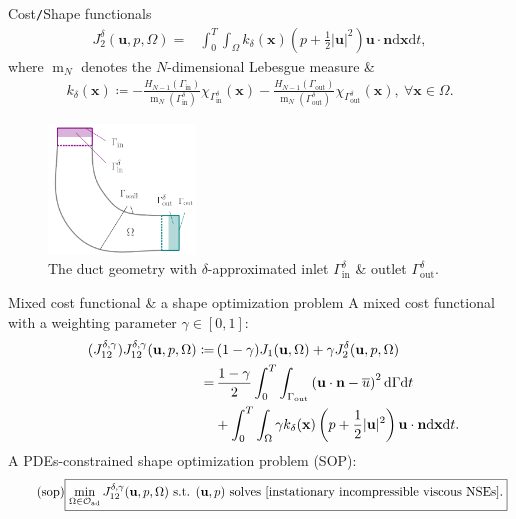 \documentclass[10pt
hyperref={
    pdfauthor={Hong Quan Ba Nguyen},
    pdftitle={Optimal Shape Design of Air Ducts in Combustion Engines: Design a General Framework},
    pdfsubject={Talk},
    pdfcreator={LaTeX},
}
]{beamer}
\begin{document}
\begin{frame}{Cost\texttt{/}Shape functionals}
    \begin{align*}
        J_2^\delta(\textbf{u},p,\Omega) =& \int_0^T\int_\Omega k_\delta(\textbf{x})\left(p + \frac{1}{2}|\textbf{u}|^2\right)\textbf{u}\cdot\textbf{n}\textrm{d}\textbf{x}\textrm{d}t,
    \end{align*}
    where $\operatorname{m}_N$ denotes the $N$-dimensional Lebesgue measure {\small\&}
    \begin{align*}
        k_\delta(\textbf{x})\coloneqq -\frac{H_{N-1}(\Gamma_{\textrm{in}})}{\operatorname{m}_N(\Gamma_{\textrm{in}}^\delta)}\chi_{\Gamma_{\textrm{in}}^\delta}(\textbf{x}) - \frac{H_{N-1}(\Gamma_{\textrm{out}})}{\operatorname{m}_N(\Gamma_{\textrm{out}}^\delta)}\chi_{\Gamma_{\textrm{out}}^\delta}(\textbf{x}),\ \forall\textbf{x}\in\Omega.
    \end{align*}
    \begin{figure}[h]
        \centering
        \includegraphics[width=0.35\textwidth]{geometry_delta}
        \caption{The duct geometry with $\delta$-approximated inlet $\Gamma_{\textrm{in}}^\delta$ {\small\&} outlet $\Gamma_{\textrm{out}}^\delta$.}
        \label{fig:geometry cutoff inlet outlet}
    \end{figure}
\end{frame}

\begin{frame}{Mixed cost functional {\small\&} a shape optimization problem}
    A mixed cost functional with a weighting parameter $\gamma\in[0,1]$:
    \begin{align}
        \label{mixed cost functional}
        \tag{$J_{12}^{\delta,\gamma}$}
        J_{12}^{\delta,\gamma}(\textbf{u},p,\Omega)\coloneqq&\, (1 - \gamma)J_1(\textbf{u},\Omega) + \gamma J_2^\delta(\textbf{u},p,\Omega)\\
        =&\, \frac{1 - \gamma}{2}\int_0^T\int_{\Gamma_{\textrm{out}}} \left(\textbf{u}\cdot\textbf{n} - \overline{u}\right)^2\textrm{d}\Gamma\textrm{d}t\nonumber\\
        &+ \int_0^T\int_\Omega \gamma k_\delta(\textbf{x})\left(p + \frac{1}{2}|\textbf{u}|^2\right)\textbf{u}\cdot\textbf{n}\textrm{d}\textbf{x}\textrm{d}t.\nonumber
    \end{align}
    A PDEs-constrained shape optimization problem (SOP):
    \begin{align}
        \label{shape optimization problem}
        \tag{sop}
        \boxed{\min_{\Omega\in\mathcal{O}_{\textrm{ad}}} J_{12}^{\delta,\gamma}(\textbf{u},p,\Omega) \mbox{ s.t. } (\textbf{u},p) \mbox{ solves \eqref{instationary incompressible viscous NSEs}}.}
    \end{align}    
\end{frame}
\end{document}
